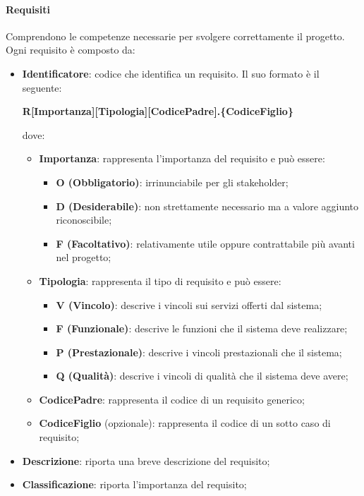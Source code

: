 \paragraph{Requisiti}
Comprendono le competenze necessarie per svolgere correttamente il progetto.\\
Ogni requisito è composto da:
\begin{itemize}
\item \textbf{Identificatore}: codice che identifica un requisito. Il suo formato è il seguente:
\begin{center}
\textbf{R[Importanza][Tipologia][CodicePadre].\{CodiceFiglio\}}\\
\end{center}
dove:
\begin{itemize}
\item \textbf{Importanza}: rappresenta l'importanza del requisito e può essere:
\begin{itemize}
\item \textbf{O (Obbligatorio)}: irrinunciabile per gli stakeholder;
\item \textbf{D (Desiderabile)}: non strettamente necessario ma a valore aggiunto riconoscibile;
\item \textbf{F (Facoltativo)}: relativamente utile oppure contrattabile più avanti nel progetto;
\end{itemize}
\item \textbf{Tipologia}: rappresenta il tipo di requisito e può essere:
\begin{itemize}
\item \textbf{V (Vincolo)}: descrive i vincoli sui servizi offerti dal sistema;
\item \textbf{F (Funzionale)}: descrive le funzioni che il sistema deve realizzare;
\item \textbf{P (Prestazionale)}: descrive i vincoli prestazionali che il sistema;
\item \textbf{Q (Qualità)}: descrive i vincoli di qualità che il sistema deve avere;
\end{itemize}
\item \textbf{CodicePadre}: rappresenta il codice di un requisito generico;
\item \textbf{CodiceFiglio} (opzionale): rappresenta il codice di un sotto caso di requisito;
\end{itemize}
\item \textbf{Descrizione}: riporta una breve descrizione del requisito;
\item \textbf{Classificazione}: riporta l'importanza del requisito;

\end{itemize}
